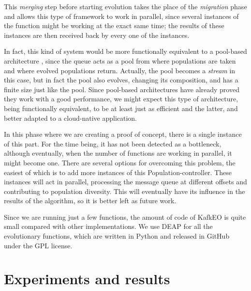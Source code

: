 \documentclass{llncs}
\begin{document}
  This {\em merging} step
  before starting evolution takes the place of the {\em migration} phase
  and allows this type of framework to work in parallel, since several
  instances of the function might be working at the exact same time; the
  results of these instances are then received back by every one of the
  instances.

  In fact, this kind of system would be more functionally equivalent to
  a pool-based architecture \cite{bollini1999distributed}, since the
  queue acts as a pool from where populations are taken and where
  evolved populations return. Actually, the pool becomes a {\em stream}
  in this case, but in fact the pool also evolves, changing its
  composition, and has a finite size just like the pool. Since
  pool-based architectures have already proved they work with a good
  performance, we might expect this type of architecture, being
  functionally equivalent, to be at least just as efficient and the
  latter, and better adapted to a cloud-native application.

  In this phase where we are creating a proof of concept, there is a
  single instance of this part. For the time being, it has not been
  detected as a bottleneck, although eventually, when the number of
  functions are working in parallel, it might become one. There are
  several options for overcoming this problem, the easiest of which is
  to add more instances of this {\sf Population-controller}. These
  instances will act in parallel, processing the message queue at
  different offsets and contributing to population diversity. This will
  eventually have its influence in the results of the algorithm, so it
  is better left as future work.

  Since we are running just a few functions, the amount of code of KafkEO
  is quite small compared with other implementations. We use DEAP for
  all the evolutionary functions, which are written in Python and
  released in GitHub under the GPL license.

  \section{Experiments and results}
  \label{sec:res}
  
\end{document}
